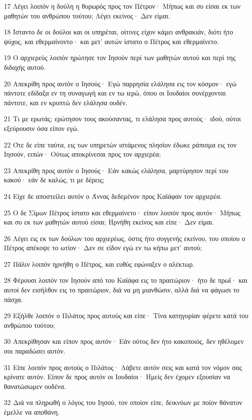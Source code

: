 \par 17 Λέγει λοιπόν η δούλη η θυρωρός προς τον Πέτρον· Μήπως και συ είσαι εκ των μαθητών του ανθρώπου τούτου; Λέγει εκείνος· Δεν είμαι.
\par 18 Ίσταντο δε οι δούλοι και οι υπηρέται, οίτινες είχον κάμει ανθρακιάν, διότι ήτο ψύχος, και εθερμαίνοντο· και μετ' αυτών ίστατο ο Πέτρος και εθερμαίνετο.
\par 19 Ο αρχιερεύς λοιπόν ηρώτησε τον Ιησούν περί των μαθητών αυτού και περί της διδαχής αυτού.
\par 20 Απεκρίθη προς αυτόν ο Ιησούς· Εγώ παρρησία ελάλησα εις τον κόσμον· εγώ πάντοτε εδίδαξα εν τη συναγωγή και εν τω ιερώ, όπου οι Ιουδαίοι συνέρχονται πάντοτε, και εν κρυπτώ δεν ελάλησα ουδέν.
\par 21 Τι με ερωτάς; ερώτησον τους ακούσαντας, τι ελάλησα προς αυτούς· ιδού, ούτοι εξεύρουσιν όσα είπον εγώ.
\par 22 Ότε δε είπε ταύτα, εις των υπηρετών ιστάμενος πλησίον έδωκε ράπισμα εις τον Ιησούν, ειπών· Ούτως αποκρίνεσαι προς τον αρχιερέα;
\par 23 Απεκρίθη προς αυτόν ο Ιησούς· Εάν κακώς ελάλησα, μαρτύρησον περί του κακού· εάν δε καλώς, τι με δέρεις;
\par 24 Είχε δε αποστείλει αυτόν ο Άννας δεδεμένον προς Καϊάφαν τον αρχιερέα.
\par 25 Ο δε Σίμων Πέτρος ίστατο και εθερμαίνετο· είπον λοιπόν προς αυτόν· Μήπως και συ εκ των μαθητών αυτού είσαι; Ηρνήθη εκείνος και είπε· Δεν είμαι.
\par 26 Λέγει εις εκ των δούλων του αρχιερέως, όστις ήτο συγγενής εκείνου, του οποίου ο Πέτρος απέκοψε το ωτίον· Δεν σε είδον εγώ εν τω κήπω μετ' αυτού;
\par 27 Πάλιν λοιπόν ηρνήθη ο Πέτρος, και ευθύς εφώναξεν ο αλέκτωρ.
\par 28 Φέρουσι λοιπόν τον Ιησούν από του Καϊάφα εις το πραιτώριον· ήτο δε πρωΐ· και αυτοί δεν εισήλθον εις το πραιτώριον, διά να μη μιανθώσιν, αλλά διά να φάγωσι το πάσχα.
\par 29 Εξήλθε λοιπόν ο Πιλάτος προς αυτούς και είπε· Τίνα κατηγορίαν φέρετε κατά του ανθρώπου τούτου;
\par 30 Απεκρίθησαν και είπον προς αυτόν· Εάν ούτος δεν ήτο κακοποιός, δεν ηθέλομεν σοι παραδώσει αυτόν.
\par 31 Είπε λοιπόν προς αυτούς ο Πιλάτος· Λάβετε αυτόν σεις και κατά τον νόμον σας κρίνατε αυτόν. Είπον δε προς αυτόν οι Ιουδαίοι· Ημείς δεν έχομεν εξουσίαν να θανατώσωμεν ουδένα.
\par 32 Διά να πληρωθή ο λόγος του Ιησού, τον οποίον είπε, δεικνύων με ποίον θάνατον έμελλε να αποθάνη.
